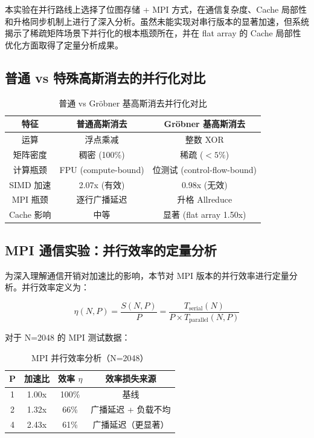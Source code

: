 \documentclass[a4paper]{article}
\begin{document}
本实验在并行路线上选择了位图存储 + MPI 方式，在通信复杂度、Cache 局部性和升格同步机制上进行了深入分析。虽然未能实现对串行版本的显著加速，但系统揭示了稀疏矩阵场景下并行化的根本瓶颈所在，并在 flat array 的 Cache 局部性优化方面取得了定量分析成果。

\subsection{普通 vs 特殊高斯消去的并行化对比}

\begin{table}[H]
  \centering
  \caption{普通 vs Gröbner 基高斯消去并行化对比}
  \begin{tabular}{|c|c|c|}
  \hline
  \textbf{特征} & \textbf{普通高斯消去} & \textbf{Gröbner 基高斯消去} \\
  \hline
  运算 & 浮点乘减 & 整数 XOR \\
  矩阵密度 & 稠密 (100\%) & 稀疏 ($<5\%$) \\
  计算瓶颈 & FPU (compute-bound) & 位测试 (control-flow-bound) \\
  SIMD 加速 & 2.07x (有效) & 0.98x (无效) \\
  MPI 瓶颈 & 逐行广播延迟 & 升格 Allreduce \\
  Cache 影响 & 中等 & 显著 (flat array 1.50x) \\
  \hline
  \end{tabular}
\end{table}

\subsection{MPI 通信实验：并行效率的定量分析}

为深入理解通信开销对加速比的影响，本节对 MPI 版本的并行效率进行定量分析。并行效率定义为：

\begin{equation}
\eta(N, P) = \frac{S(N, P)}{P} = \frac{T_{\text{serial}}(N)}{P \times T_{\text{parallel}}(N, P)}
\end{equation}

对于 N=2048 的 MPI 测试数据：

\begin{table}[H]
  \centering
  \caption{MPI 并行效率分析（N=2048）}
  \begin{tabular}{|c|c|c|c|}
  \hline
  \textbf{P} & \textbf{加速比} & \textbf{效率 $\eta$} & \textbf{效率损失来源} \\
  \hline
  1 & 1.00x & 100\% & 基线 \\
  2 & 1.32x & 66\% & 广播延迟 + 负载不均 \\
  4 & 2.43x & 61\% & 广播延迟（更显著） \\
  \hline
  \end{tabular}
\end{table}
\end{document}
